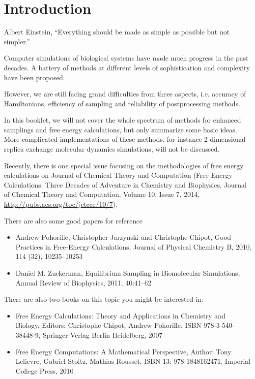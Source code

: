 \chapter{Introduction\label{chapter:introduction}}

\begin{chapquote}{Albert Einstein, %
	}
``Everything should be made as simple as possible but not simpler.''
\end{chapquote}

Computer simulations of biological systems have made much progress in the past decades. A battery of methods at different levels of sophistication and complexity have been proposed.

However, we are still facing grand difficulties from three aspects, i.e. accuracy of Hamiltonians, efficiency of sampling and reliability of postprocessing methods.\cite{NielsJCTC2014}

In this booklet, we will not cover the whole spectrum of methods for enhanced samplings and free energy calculations, but only summarize some basic ideas. 
More complicated implementations of these methods, for instance 2-dimensional replica exchange molecular dynamics simulations, will not be discussed.

Recently, there is one special issue focusing on the methodologies of free energy calculations on Journal of Chemical Theory and Computation (Free Energy Calculations: Three Decades of Adventure in Chemistry and Biophysics, Journal of Chemical Theory and Computation, Volume 10, Issue 7, 2014, \url{http://pubs.acs.org/toc/jctcce/10/7}). 

There are also some good papers for reference
\begin{itemize}
	\item Andrew Pohorille, Christopher Jarzynski and Christophe Chipot, Good Practices in Free-Energy Calculations, Journal of Physical Chemistry B, 2010, 114 (32), 10235–10253
	\item Daniel M. Zuckerman, Equilibrium Sampling in Biomolecular Simulations, Annual Review of Biophysics, 2011, 40:41–62
\end{itemize}


There are also two books on this topic you might be interested in:
\begin{itemize}
\item Free Energy Calculations: Theory and Applications in Chemistry and Biology, Editors: Christophe Chipot, Andrew Pohorille, ISBN 978-3-540-38448-9, Springer-Verlag Berlin Heidelberg, 2007
\item Free Energy Computations: A Mathematical Perspective, Author: Tony Lelievre, Gabriel Stoltz, Mathias Rousset, ISBN-13: 978-1848162471, Imperial College Press, 2010
\end{itemize}

